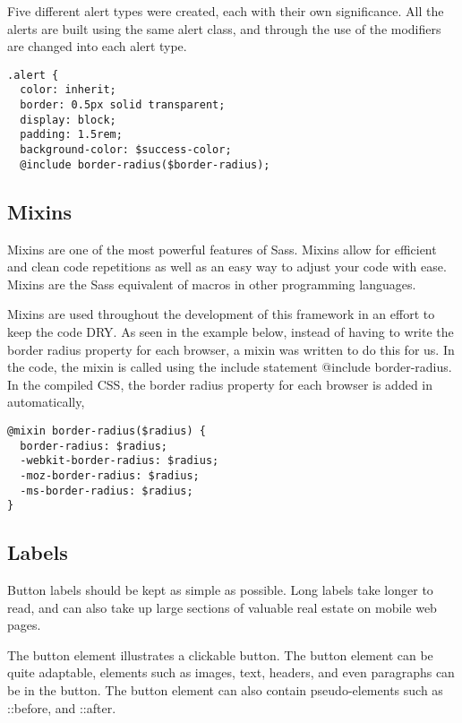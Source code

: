 Five different alert types were created, each with their own significance. All the alerts are built using the same alert class, and through the use of the modifiers are changed into each alert type. 

\begin{lstlisting}[language=CSS3]
.alert {
  color: inherit;
  border: 0.5px solid transparent;
  display: block;
  padding: 1.5rem;
  background-color: $success-color;
  @include border-radius($border-radius);
\end{lstlisting}

\subsection*{Mixins}
Mixins are one of the most powerful features of Sass. Mixins allow for efficient and clean code repetitions as well as an easy way to adjust your code with ease. Mixins are the Sass equivalent of macros in other programming languages.

Mixins are used throughout the development of this framework in an effort to keep the code DRY. As seen in the example below, instead of having to write the border radius property for each browser, a mixin was written to do this for us. In the code, the mixin is called using the include statement @include border-radius. In the compiled CSS, the border radius property for each browser is added in automatically, 

\begin{lstlisting}[language=CSS3]
@mixin border-radius($radius) {
  border-radius: $radius;
  -webkit-border-radius: $radius;
  -moz-border-radius: $radius;
  -ms-border-radius: $radius;
}
\end{lstlisting}

\subsection*{Labels}
Button labels should be kept as simple as possible. Long labels take longer to read, and can also take up large sections of valuable real estate on mobile web pages. 

The button element illustrates a clickable button. The button element can be quite adaptable, elements such as images, text, headers, and even paragraphs can be in the button. The button element can also contain pseudo-elements such as ::before, and ::after. 

